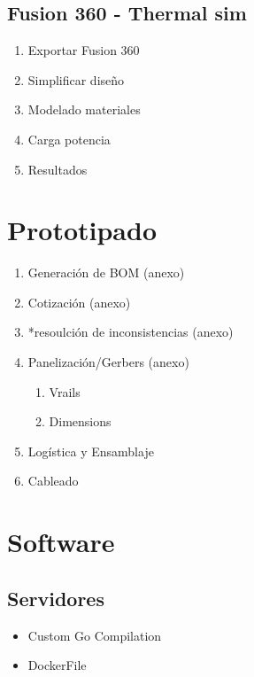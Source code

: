 \documentclass[11pt]{article}
\begin{document}
\subsection{Fusion 360 - Thermal sim}
\label{sec:orgfa8c9c9}
\begin{enumerate}
\item Exportar Fusion 360\\
\item Simplificar diseño\\
\item Modelado materiales\\
\item Carga potencia\\
\item Resultados\\
\end{enumerate}
\section{Prototipado}
\label{sec:org52a8ca8}
\begin{enumerate}
\item Generación de BOM (anexo)\\
\item Cotización (anexo)\\
\item *resoulción de inconsistencias (anexo)\\
\item Panelización/Gerbers (anexo)\\
\begin{enumerate}
\item Vrails\\
\item Dimensions\\
\end{enumerate}
\item Logística y Ensamblaje\\
\item Cableado\\
\end{enumerate}
\section{Software}
\label{sec:org5fafa9b}
\subsection{Servidores}
\label{sec:org2519d8a}
\begin{itemize}
\item Custom Go Compilation\\
\item DockerFile\\
\end{itemize}
\end{document}
